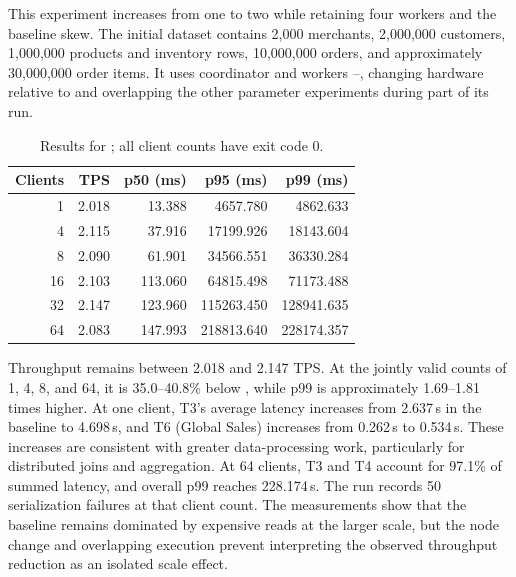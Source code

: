 
This experiment increases  from one to two while retaining
four workers and the baseline skew.
The initial dataset contains 2,000 merchants, 2,000,000 customers,
1,000,000 products and inventory rows, 10,000,000 orders, and
approximately 30,000,000 order items.
It uses coordinator  and workers
--, changing hardware relative to 
and overlapping the other parameter experiments during part of its run.

\begin{table}[htbp]
  \centering
  \begin{tabular}{@{}rrrrr@{}}
    \toprule
    Clients & TPS & p50 (ms) & p95 (ms) & p99 (ms) \\
    \midrule
     1 & 2.018 &  13.388 &   4657.780 &   4862.633 \\
     4 & 2.115 &  37.916 &  17199.926 &  18143.604 \\
     8 & 2.090 &  61.901 &  34566.551 &  36330.284 \\
    16 & 2.103 & 113.060 &  64815.498 &  71173.488 \\
    32 & 2.147 & 123.960 & 115263.450 & 128941.635 \\
    64 & 2.083 & 147.993 & 218813.640 & 228174.357 \\
    \bottomrule
  \end{tabular}
  \caption{Results for ; all client counts have exit code 0.}
  \label{tab:a0-3-results}
\end{table}

Throughput remains between 2.018 and 2.147 TPS.
At the jointly valid counts of 1, 4, 8, and 64, it is
35.0--40.8\% below , while p99 is approximately
1.69--1.81 times higher.
At one client, T3's average latency increases from 2.637\,s in the
baseline to 4.698\,s, and T6 (Global Sales) increases from
0.262\,s to 0.534\,s.
These increases are consistent with greater data-processing work,
particularly for distributed joins and aggregation.
At 64 clients, T3 and T4 account for 97.1\% of summed latency,
and overall p99 reaches 228.174\,s.
The run records 50 serialization failures at that client count.
The measurements show that the baseline remains dominated by expensive
reads at the larger scale, but the node change and overlapping execution
prevent interpreting the observed throughput reduction as an isolated
scale effect.
